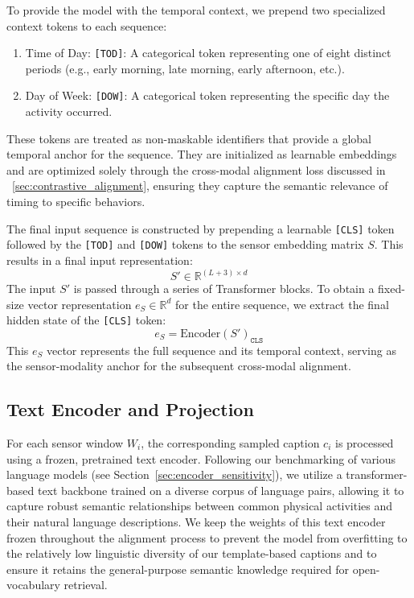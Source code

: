 To provide the model with the temporal context, we prepend two specialized context tokens to each sequence:
\begin{enumerate}
    \item Time of Day: \texttt{[TOD]}: A categorical token representing one of eight distinct periods (e.g., early morning, late morning, early afternoon, etc.).
    \item Day of Week: \texttt{[DOW]}: A categorical token representing the specific day the activity occurred.
\end{enumerate}
These tokens are treated as non-maskable identifiers that provide a global temporal anchor for the sequence. They are initialized as learnable embeddings and are optimized solely through the cross-modal alignment loss discussed in ~\cref{sec:contrastive_alignment}, ensuring they capture the semantic relevance of timing to specific behaviors.

The final input sequence is constructed by prepending a learnable \texttt{[CLS]} token followed by the \texttt{[TOD]} and \texttt{[DOW]} tokens to the sensor embedding matrix $S$. This results in a final input representation:
\begin{equation}
S' \in \mathbb{R}^{(L+3) \times d}
\end{equation}
The input $S'$ is passed through a series of Transformer blocks. To obtain a fixed-size vector representation $e_S \in \mathbb{R}^{d}$ for the entire sequence, we extract the final hidden state of the \texttt{[CLS]} token:
\begin{equation}
e_S = \text{Encoder}(S')_{\texttt{CLS}}
\end{equation}
This $e_S$ vector represents the full sequence and its temporal context, serving as the sensor-modality anchor for the subsequent cross-modal alignment.


\subsection{Text Encoder and Projection}
\label{sec:text_encoder_details}

For each sensor window $W_i$, the corresponding sampled caption $c_i$ is processed using a frozen, pretrained text encoder. Following our benchmarking of various language models (see Section~\ref{sec:encoder_sensitivity}), we utilize a transformer-based text backbone trained on a diverse corpus of language pairs, allowing it to capture robust semantic relationships between common physical activities and their natural language descriptions. We keep the weights of this text encoder frozen throughout the alignment process to prevent the model from overfitting to the relatively low linguistic diversity of our template-based captions and to ensure it retains the general-purpose semantic knowledge required for open-vocabulary retrieval.

